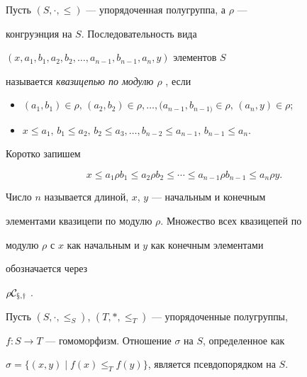  


Пусть $(S,\cdot,\le)$ --- упорядоченная полугруппа, а $\rho$ --- 


конгруэнция на $S$. Последовательность вида 


$(x,a_1,b_1,a_2,b_2,\dotsc,a_{n-1},b_{n-1},a_n,y)$ элементов $S$ 


называется {\it квазицепью по модулю $\rho$} \cite{1a}, если 


\begin{itemize} 


\item[1)] $(a_1,b_1)\in\rho,\,(a_2,b_2)\in\rho,\dotsc, 


(a_{n-1},b_{n-1)}\in\rho,\,(a_n,y)\in\rho$; 


\item[2)] $x\le a_1,\,b_1\le a_2,\,b_2\le a_3,\dotsc, 


b_{n-2}\le a_{n-1},\,b_{n-1}\le a_n$. 


\end{itemize} 


Коротко запишем


$$ 


x\le a_1\rho b_1\le a_2\rho b_2\le\dotsb\le 


a_{n-1}\rho b_{n-1}\le a_n\rho y. 


$$ 


 


Число $n$ называется длиной, $x$, $y$ --- начальным и конечным 


элементами квазицепи по модулю $\rho$. Множество всех квазицепей по 


модулю $\rho$ с $x$ как начальным и $y$ как конечным элементами 


обозначается через 


$\rho\cal C_{x,y}$ \cite{1a}. 


 


\begin{lem} 


Пусть $(S,\cdot,\le_S)$, $(T,*,\le_T)$ --- упорядоченные полугруппы, 


$f:S\to T$ --- гомоморфизм. Отношение $\sigma$ на $S$, определенное как 


$\sigma=\{(x,y)\mid f(x)\le_T f(y)\}$, является псевдопорядком на $S$. 


\end{lem} 


